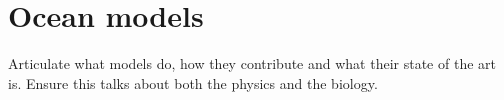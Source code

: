 \section{Ocean models}

Articulate what models do, how they contribute and what their state of
the art is. Ensure this talks about both the physics and the biology.